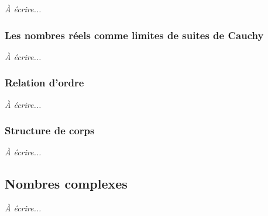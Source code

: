 \emph{À écrire...}

\subsubsection{Les nombres réels comme limites de suites de Cauchy}

\emph{À écrire...}

\subsubsection{Relation d'ordre}

\emph{À écrire...}

\subsubsection{Structure de corps}

\emph{À écrire...}

\subsection{Nombres complexes}

\emph{À écrire...}
